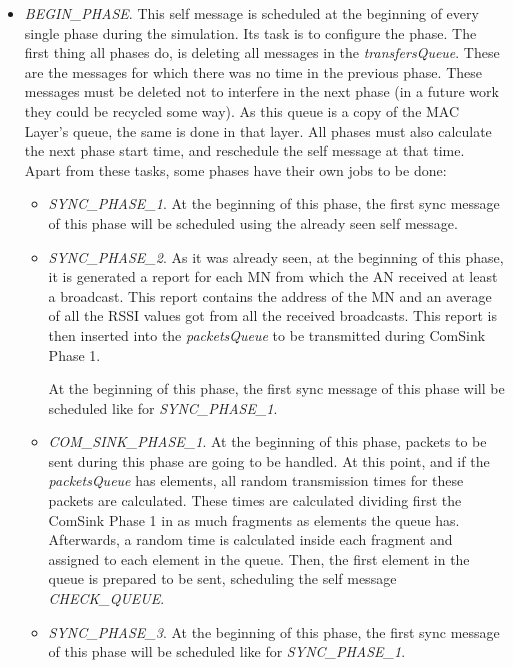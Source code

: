 \begin{itemize}
\begin{itemize}
    \item \textit{BEGIN\_PHASE}. This self message is scheduled at the beginning of every single phase during the simulation. Its task is to 
    configure the phase. The first thing all phases do, is deleting all messages in the \textit{transfersQueue}. These are the messages for which 
    there was no time in the previous phase. These messages must be deleted not to interfere in the next phase (in a future work they could be 
    recycled some way). As this queue is a copy of the \ac{MAC} Layer's queue, the same is done in that layer. All phases must also calculate the 
    next phase start time, and reschedule the self message at that time. Apart from these tasks, some phases have their own jobs to be done:
    \begin{itemize}
      \item \textit{SYNC\_PHASE\_1}. At the beginning of this phase, the first sync message of this phase will be scheduled using the 
      already seen self message.

      \item \textit{SYNC\_PHASE\_2}. As it was already seen, at the beginning of this phase, it is generated a report for each \ac{MN} from which 
      the \ac{AN} received at least a broadcast. This report contains the address of the \ac{MN} and an average of all the \ac{RSSI} values 
      got from all the received broadcasts. This report is then inserted into the \textit{packetsQueue} to be transmitted during ComSink Phase 1.
      
      At the beginning of this phase, the first sync message of this phase will be scheduled like for \textit{SYNC\_PHASE\_1}.

      \item \textit{COM\_SINK\_PHASE\_1}. At the beginning of this phase, packets to be sent during this phase are going to be handled. At 
      this point, and if the \textit{packetsQueue} has elements, all random transmission times for these packets are calculated. These times 
      are calculated dividing first the ComSink Phase 1 in as much fragments as elements the queue has. Afterwards, a random time is 
      calculated inside each fragment and assigned to each element in the queue. Then, the first element in the queue is prepared to be 
      sent, scheduling the self message \textit{CHECK\_QUEUE}.

      \item \textit{SYNC\_PHASE\_3}. At the beginning of this phase, the first sync message of this phase will be scheduled like 
      for \textit{SYNC\_PHASE\_1}.
    \end{itemize}
  \end{itemize}
\end{itemize}



